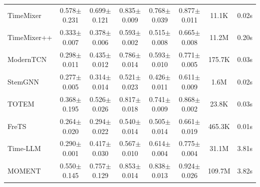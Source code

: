 \begin{table}[t]
\begin{small}
\begin{tabular}{l|ccccc|cc}
        TimeMixer & 0.578$\pm$0.231 & 0.699$\pm$0.121 & 0.835$\pm$0.009 & 0.768$\pm$0.039 & 0.877$\pm$0.011 & 11.1K & 0.02s \\
        TimeMixer++ & 0.333$\pm$0.007 & 0.378$\pm$0.006 & 0.593$\pm$0.002 & 0.515$\pm$0.008 & 0.665$\pm$0.008 & 11.2M & 0.20s \\
        ModernTCN & 0.298$\pm$0.011 & 0.435$\pm$0.012 & 0.786$\pm$0.014 & 0.593$\pm$0.010 & 0.771$\pm$0.005 & 175.7K & 0.03s \\
        StemGNN & 0.277$\pm$0.005 & 0.314$\pm$0.014 & 0.521$\pm$0.023 & 0.426$\pm$0.011 & 0.611$\pm$0.009 & 1.6M & 0.02s \\
        TOTEM & 0.368$\pm$0.195 & 0.526$\pm$0.026 & 0.817$\pm$0.018 & 0.741$\pm$0.009 & 0.868$\pm$0.002 & 23.8K & 0.03s \\
        FreTS & 0.264$\pm$0.020 & 0.294$\pm$0.022 & 0.540$\pm$0.014 & 0.505$\pm$0.014 & 0.661$\pm$0.019 & 465.3K & 0.01s \\
        Time-LLM & 0.290$\pm$0.001 & 0.417$\pm$0.030 & 0.567$\pm$0.010 & 0.614$\pm$0.004 & 0.775$\pm$0.004 & 31.1M & 3.81s \\
        MOMENT & 0.550$\pm$0.145 & 0.757$\pm$0.129 & 0.853$\pm$0.014 & 0.838$\pm$0.013 & 0.924$\pm$0.026 & 109.7M & 3.82s \\
        \bottomrule
    \end{tabular}
    \end{small}
\end{table}